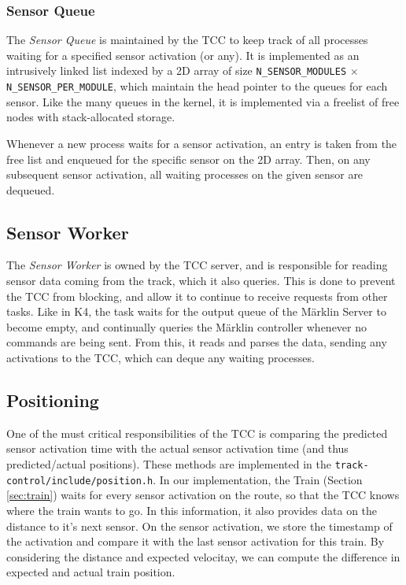 \documentclass[12pt, titlepage]{article}
\begin{document}
    \subsubsection{Sensor Queue}
    \label{sec:sensor-queue}
    
    The \emph{Sensor Queue} is maintained by the TCC to keep track of all processes waiting for a specified sensor activation (or any).
    It is implemented as an intrusively linked list indexed by a 2D array of size \verb`N_SENSOR_MODULES` $\times$ \verb`N_SENSOR_PER_MODULE`, which maintain the head pointer to the queues for each sensor.
    Like the many queues in the kernel, it is implemented via a freelist of free nodes with stack-allocated storage.

    Whenever a new process waits for a sensor activation, an entry is taken from the free list and enqueued for the specific sensor on the 2D array. Then, on any subsequent sensor activation, all waiting processes on the given sensor are dequeued. 

    \subsection{Sensor Worker}
    \label{sec:sensor-worker}
    
    The \emph{Sensor Worker} is owned by the TCC server, and is responsible for reading sensor data coming from the track, which it also queries. This is done to prevent the TCC from blocking, and allow it to continue to receive requests from other tasks. Like in K4, the task waits for the output queue of the Märklin Server to become empty, and continually queries the Märklin controller whenever no commands are being sent. From this, it reads and parses the data, sending any activations to the TCC, which can deque any waiting processes.

    \subsection{Positioning}
    \label{sec:positioning}
    
    One of the must critical responsibilities of the TCC is comparing the predicted sensor activation time with the actual sensor activation time (and thus predicted/actual positions).
    These methods are implemented in the \verb`track-control/include/position.h`.
    In our implementation, the Train (Section \ref{sec:train}) waits for every sensor activation on the route, so that the TCC knows where the train wants to go. In this information, it also provides data on the distance to it's next sensor.
    On the sensor activation, we store the timestamp of the activation and compare it with the last sensor activation for this train. 
    By considering the distance and expected velocitay, we can compute the difference in expected and actual train position.
    
\end{document}
